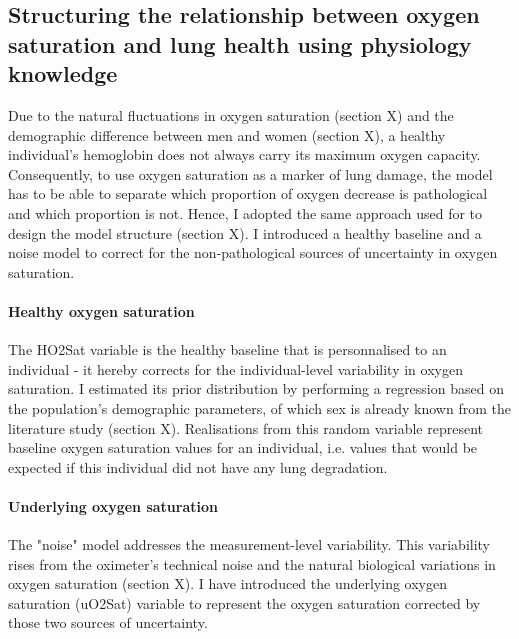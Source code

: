 \subsection{Structuring the relationship between oxygen saturation and lung health using physiology knowledge}
Due to the natural fluctuations in oxygen saturation (section X) and the demographic difference between men and women (section X), a healthy individual’s hemoglobin does not always carry its maximum oxygen capacity. Consequently, to use oxygen saturation as a marker of lung damage, the model has to be able to separate which proportion of oxygen decrease is pathological and which proportion is not. Hence, I adopted the same approach used for \F to design the model structure (section X). I introduced a healthy baseline and a noise model to correct for the non-pathological sources of uncertainty in oxygen saturation.

\paragraph{Healthy oxygen saturation}
The HO2Sat variable is the healthy baseline that is personnalised to an individual - it hereby corrects for the individual-level variability in oxygen saturation. I estimated its prior distribution by performing a regression based on the population's demographic parameters, of which sex is already known from the literature study (section X). Realisations from this random variable represent baseline oxygen saturation values for an individual, i.e. values that would be expected if this individual did not have any lung degradation.

\paragraph{Underlying oxygen saturation}
The "noise" model addresses the measurement-level variability. This variability rises from the oximeter's technical noise and the natural biological variations in oxygen saturation (section X). I have introduced the underlying oxygen saturation (uO2Sat) variable to represent the oxygen saturation corrected by those two sources of uncertainty.

